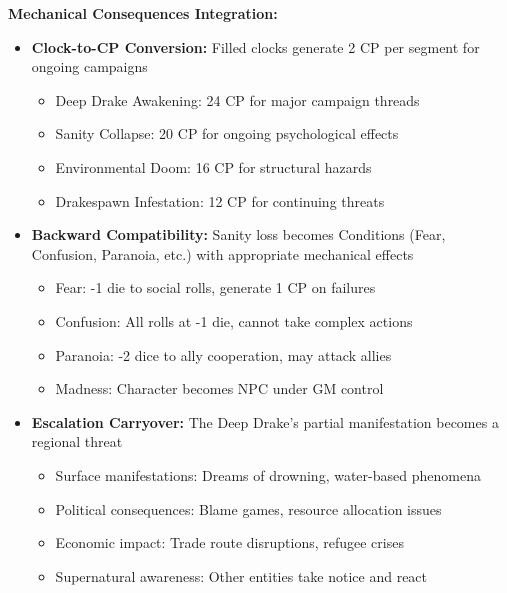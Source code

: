 \documentclass[11pt]{article}
\begin{document}
\begin{itemize}
\begin{itemize}
\begin{itemize}
\begin{itemize}
\begin{itemize}
\textbf{Mechanical Consequences Integration:} \begin{itemize} \item \textbf{Clock-to-CP Conversion:} Filled clocks generate 2 CP per segment for ongoing campaigns \begin{itemize} \item Deep Drake Awakening: 24 CP for major campaign threads \item Sanity Collapse: 20 CP for ongoing psychological effects \item Environmental Doom: 16 CP for structural hazards \item Drakespawn Infestation: 12 CP for continuing threats \end{itemize} \item \textbf{Backward Compatibility:} Sanity loss becomes Conditions (Fear, Confusion, Paranoia, etc.) with appropriate mechanical effects \begin{itemize} \item Fear: -1 die to social rolls, generate 1 CP on failures \item Confusion: All rolls at -1 die, cannot take complex actions \item Paranoia: -2 dice to ally cooperation, may attack allies \item Madness: Character becomes NPC under GM control \end{itemize} \item \textbf{Escalation Carryover:} The Deep Drake's partial manifestation becomes a regional threat \begin{itemize} \item Surface manifestations: Dreams of drowning, water-based phenomena \item Political consequences: Blame games, resource allocation issues \item Economic impact: Trade route disruptions, refugee crises \item Supernatural awareness: Other entities take notice and react \end{itemize} \end{itemize}


\end{itemize}
\end{itemize}
\end{itemize}
\end{itemize}
\end{itemize}
\end{document}
